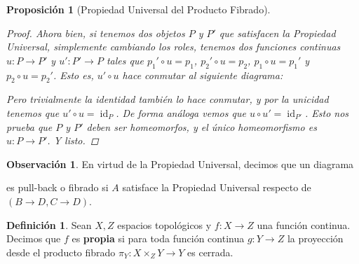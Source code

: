 \documentclass[12pt]{book}
\newtheorem{prop}[teo]{Proposición}
\theoremstyle{definition}
\newtheorem{obs}[teo]{Observación}
\newtheorem{defn}[teo]{Definición}
\DeclareMathOperator{\id}{id}
\begin{document}
\begin{prop}[Propiedad Universal del Producto Fibrado]
\begin{proof}
Ahora bien, si tenemos dos objetos $P$ y $P'$ que satisfacen la Propiedad Universal, simplemente cambiando los roles, tenemos dos funciones continuas $u:P\to P'$ y $u':P'\to P$ tales que $p_1'\circ u = p_1$, $p_2'\circ u=p_2$, $p_1\circ u = p_1'$ y $p_2\circ u = p_2'$. Esto es, $u'\circ u$  hace conmutar al siguiente diagrama:
\begin{center}
\end{center}
Pero trivialmente la identidad también lo hace conmutar, y por la unicidad tenemos que $u'\circ u=\id_P$. De forma análoga vemos que $u\circ u' = \id_{P'}$. Esto nos prueba que $P$ y $P'$ deben ser homeomorfos, y el único homeomorfismo es $u:P\to P'$. Y listo.
\end{proof}
\end{prop}

\begin{obs}
En virtud de la Propiedad Universal, decimos que un diagrama  \begin{center}
\end{center} es pull-back o fibrado si $A$ satisface la Propiedad Universal respecto de $(B\to D,C\to D)$.
\end{obs}

\begin{defn}
Sean $X,Z$ espacios topológicos y $f:X\to Z$ una función continua. Decimos que $f$ es \textbf{propia} si para toda función continua $g:Y\to Z$ la proyección desde el producto fibrado $\pi_Y:X\times_Z Y\to Y$ es cerrada.
\end{defn}
\end{document}

